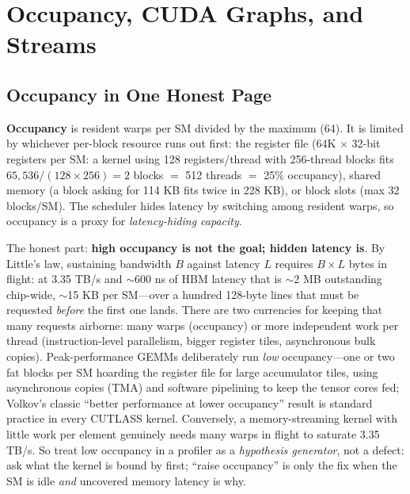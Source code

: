 \section{Occupancy, CUDA Graphs, and Streams}
\label{sec:gpu_occupancy}

\subsection{Occupancy in One Honest Page}

\textbf{Occupancy} is resident warps per SM divided by the maximum (64). It is limited by whichever per-block resource runs out first: the register file (64K $\times$ 32-bit registers per SM: a kernel using 128 registers/thread with 256-thread blocks fits $65{,}536/(128 \times 256) = 2$ blocks $=$ 512 threads $=$ 25\% occupancy), shared memory (a block asking for 114 KB fits twice in 228 KB), or block slots (max 32 blocks/SM). The scheduler hides latency by switching among resident warps, so occupancy is a proxy for \textit{latency-hiding capacity}.

The honest part: \textbf{high occupancy is not the goal; hidden latency is}. By Little's law, sustaining bandwidth $B$ against latency $L$ requires $B \times L$ bytes in flight: at 3.35 TB/s and $\sim$600 ns of HBM latency that is $\sim$2 MB outstanding chip-wide, $\sim$15 KB per SM---over a hundred 128-byte lines that must be requested \textit{before} the first one lands. There are two currencies for keeping that many requests airborne: many warps (occupancy) or more independent work per thread (instruction-level parallelism, bigger register tiles, asynchronous bulk copies). Peak-performance GEMMs deliberately run \textit{low} occupancy---one or two fat blocks per SM hoarding the register file for large accumulator tiles, using asynchronous copies (TMA) and software pipelining to keep the tensor cores fed; Volkov's classic ``better performance at lower occupancy'' result is standard practice in every CUTLASS kernel. Conversely, a memory-streaming kernel with little work per element genuinely needs many warps in flight to saturate 3.35 TB/s. So treat low occupancy in a profiler as a \textit{hypothesis generator}, not a defect: ask what the kernel is bound by first; ``raise occupancy'' is only the fix when the SM is idle \textit{and} uncovered memory latency is why.

